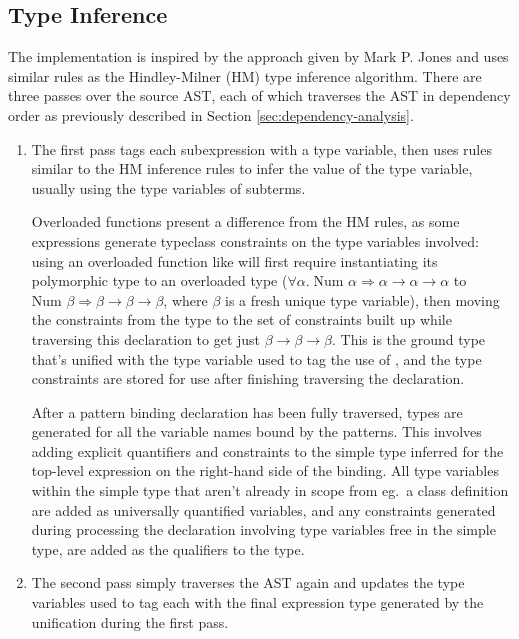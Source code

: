 \documentclass[dissertation.tex]{subfiles}
\begin{document}
{    \subsection{Type Inference}
    {
        The implementation is inspired by the approach given by Mark P. Jones\cite{THIH} and uses similar rules as the Hindley-Milner (HM) type inference algorithm. There are three passes over the source AST, each of which traverses the AST in dependency order as previously described in Section \ref{sec:dependency-analysis}.

        \begin{enumerate}
        \item
        {
            The first pass tags each subexpression with a type variable, then uses rules similar to the HM inference rules to infer the value of the type variable, usually using the type variables of subterms.
            
            Overloaded functions present a difference from the HM rules, as some expressions generate typeclass constraints on the type variables involved: using an overloaded function like \haskell{(+)} will first require instantiating its polymorphic type to an overloaded type (\(\forall\alpha.\;\text{Num }\alpha\Rightarrow\alpha\rightarrow\alpha\rightarrow\alpha\) to \(\text{Num }\beta\Rightarrow\beta\rightarrow\beta\rightarrow\beta\), where \(\beta\) is a fresh unique type variable), then moving the constraints from the type to the set of constraints built up while traversing this declaration to get just \(\beta\rightarrow\beta\rightarrow\beta\). This is the ground type that's unified with the type variable used to tag the use of \haskell{(+)}, and the type constraints are stored for use after finishing traversing the declaration.

            After a pattern binding declaration has been fully traversed, types are generated for all the variable names bound by the patterns. This involves adding explicit quantifiers and constraints to the simple type inferred for the top-level expression on the right-hand side of the binding. All type variables within the simple type that aren't already in scope from eg.\ a class definition are added as universally quantified variables, and any constraints generated during processing the declaration involving type variables free in the simple type, are added as the qualifiers to the type.
        }
        \item
        {
            The second pass simply traverses the AST again and updates the type variables used to tag each with the final expression type generated by the unification during the first pass.
            
}
\end{enumerate}}}
\end{document}
